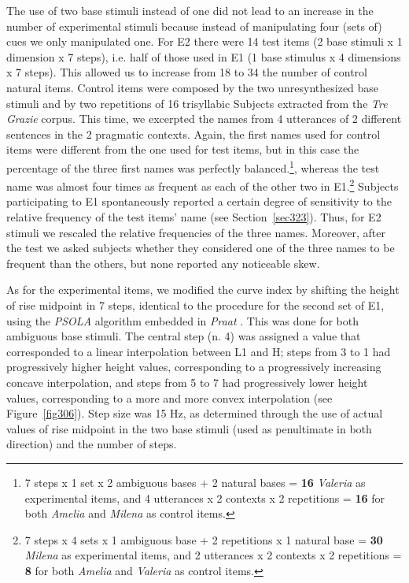 The use of two base stimuli instead of one did not lead to an increase in the number of experimental stimuli because instead of manipulating four (sets of) cues we only manipulated one. For E2 there were 14 test items (2 base stimuli x 1 dimension x 7 steps), i.e. half of those used in E1 (1 base stimulus x 4 dimensions x 7 steps). This allowed us to increase from 18 to 34 the number of control natural items. Control items were composed by the two unresynthesized base stimuli and by two repetitions of 16 trisyllabic Subjects extracted from the \textit{Tre Grazie} corpus. This time, we excerpted the names from 4 utterances of 2 different sentences in the 2 pragmatic contexts. Again, the first names used for control items were different from the one used for test items, but in this case the percentage of the three first names was perfectly balanced.\footnote{7 steps x 1 set x 2 ambiguous bases + 2 natural bases = \textbf{16} \textit{Valeria} as experimental items, and 4 utterances x 2 contexts x 2 repetitions = \textbf{16} for both \textit{Amelia} and \textit{Milena} as control items.}, whereas the test name was almost four times as frequent as each of the other two in E1.\footnote{7 steps x 4 sets x 1 ambiguous base + 2 repetitions x 1 natural base = \textbf{30} \textit{Milena} as experimental items, and 2 utterances x 2 contexts x 2 repetitions = \textbf{8} for both \textit{Amelia} and \textit{Valeria} as control items.} Subjects participating to E1 spontaneously reported a certain degree of sensitivity to the relative frequency of the test items' name (see Section~\ref{sec323}). Thus, for E2 stimuli we rescaled the relative frequencies of the three names. Moreover, after the test we asked subjects whether they considered one of the three names to be frequent than the others, but none reported any noticeable skew.

As for the experimental items, we modified the curve index by shifting the height of rise midpoint in 7 steps, identical to the procedure for the second set of E1, using the \textit{PSOLA} algorithm \citep{moulines1990pitchsyncronous} embedded in \textit{Praat} \citep{boersma2008praat}. This was done for both ambiguous base stimuli. The central step (n. 4) was assigned a value that corresponded to a linear interpolation between L1 and H; steps from 3 to 1 had progressively higher height values, corresponding to a progressively increasing concave interpolation, and steps from 5 to 7 had progressively lower height values, corresponding to a more and more convex interpolation (see Figure~\ref{fig306}). Step size was 15 Hz, as determined through the use of actual values of rise midpoint in the two base stimuli (used as penultimate in both direction) and the number of steps.

